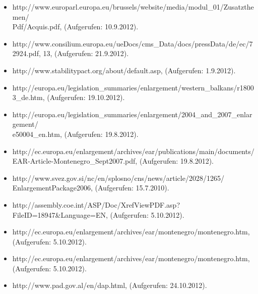 \begin{itemize}[label={},leftmargin=*,itemsep=0pt,parsep=10pt]
\item http://www.europarl.europa.eu/brussels/website/media/modul\_01/Zusatzthemen/\\Pdf/Acquis.pdf, (Aufgerufen: 10.9.2012).
\item http://www.consilium.europa.eu/ueDocs/cms\_Data/docs/pressData/de/ec/72924.pdf, 13, (Aufgerufen: 21.9.2012).
\item http://www.stabilitypact.org/about/default.asp, (Aufgerufen: 1.9.2012).
\item http://europa.eu/legislation\_summaries/enlargement/western\_balkans/r18003\_de.htm, (Aufgerufen: 19.10.2012).
\item http://europa.eu/legislation\_summaries/enlargement/2004\_and\_2007\_enlargement/\\e50004\_en.htm, (Aufgerufen: 19.8.2012).
\item http://ec.europa.eu/enlargement/archives/ear/publications/main/documents/
EAR-Article-Montenegro\_Sept2007.pdf, (Aufgerufen: 19.8.2012).
\item http://www.svez.gov.si/nc/en/splosno/cns/news/article/2028/1265/\\EnlargementPackage2006, (Aufgerufen: 15.7.2010).
\item http://assembly.coe.int/ASP/Doc/XrefViewPDF.asp?FileID=18947\&Language=EN, (Aufgerufen: 5.10.2012).
\item http://ec.europa.eu/enlargement/archives/ear/montenegro/montenegro.htm, (Aufgerufen: 5.10.2012).
\item http://ec.europa.eu/enlargement/archives/ear/montenegro/montenegro.htm, (Aufgerufen: 5.10.2012).
\item http://www.pad.gov.al/en/dap.html, (Aufgerufen: 24.10.2012).
\end{itemize}
\providecommand*{\appendixmore}{}%
\newcommand*{\SavedOriginalchaptertocentry}{}
\appto\appendixmore{%
  \let\SavedOriginaladdchaptertocentry\addchaptertocentry
  \renewcommand*{\addchaptertocentry}[2]{%
    \ifstr{#1}{}{%
      \SavedOriginalchaptertocentry{#1}{#2}%
    }{%
      \SavedOriginaladdchaptertocentry{}{%
        \string\expandafter\string\MakeUppercase\string\appendixname
        ~#1:\string\enskip{}#2}%
    }%
  }%
}

